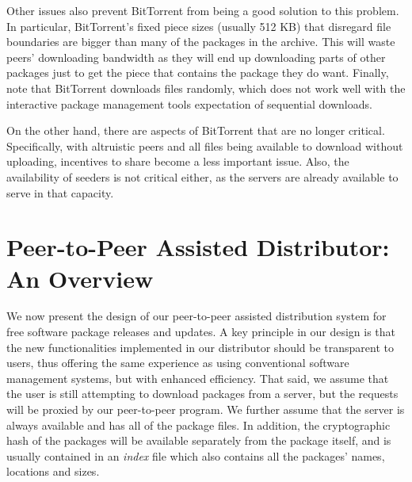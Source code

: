 \documentclass[conference]{IEEEtran}
\begin{document}
Other issues also prevent BitTorrent from being a good solution to
this problem. In particular, BitTorrent's fixed piece sizes (usually 512 KB) that disregard file
boundaries are bigger than many of the packages in the archive. This
will waste peers' downloading bandwidth as they will end up
downloading parts of other packages just to get the piece that
contains the package they do want.
Finally, note that BitTorrent downloads files
randomly, which does not work well with the interactive package
management tools expectation of sequential downloads.

On the other hand, there are aspects of BitTorrent that are no
longer critical. Specifically, with altruistic peers
and all files being available to download without uploading, incentives to share
become a less important issue. Also, the availability of seeders is
not critical either, as the servers are already available to serve in
that capacity.


\section{Peer-to-Peer Assisted Distributor: An Overview}
\label{opportunity}

We now present the design of our peer-to-peer assisted distribution system for free software package releases and
updates. A key principle in our design is that the new functionalities implemented in our distributor should be transparent to users,
thus offering the same experience as using conventional software management systems, but with enhanced efficiency.
That said, we assume that the user is still attempting to download packages from a
server, but the requests will be proxied by our peer-to-peer program.
We further assume that the server is always available and has all of the package files.
In addition, the cryptographic hash of the packages will be available
separately from the package itself, and is usually contained in an
\emph{index} file which also contains all the packages' names,
locations and sizes.
\end{document}
